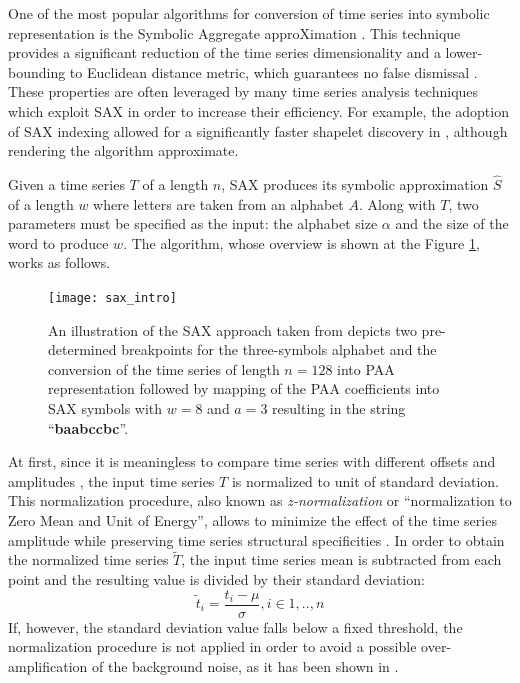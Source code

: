 One of the most popular algorithms for conversion of time series into symbolic representation is the Symbolic Aggregate approXimation \cite{sax}. 
This technique provides a significant reduction of the time series dimensionality and a lower-bounding to Euclidean distance 
metric, which guarantees no false dismissal \cite{citeulike:2821475}. 
These properties are often leveraged by many time series analysis techniques which exploit SAX in order to increase their efficiency. 
For example, the adoption of SAX indexing allowed for a significantly faster shapelet discovery in \cite{citeulike:12563493}, 
although rendering the algorithm approximate. 

Given a time series $T$ of a length $n$, SAX produces its symbolic approximation $\hat{S}$ of a length $w$ where letters are taken 
from an alphabet $A$. Along with $T$, two parameters must be specified as the input: the alphabet size $\alpha$ and the size of 
the word to produce $w$. The algorithm, whose overview is shown at the Figure \ref{fig:sax_intro}, works as follows. 

\begin{figure}[tbp]
   \centering
   \texttt{[image: sax\_intro]}
   \caption[An illustration of the symbolic aggregate discretization algorithm.]
   {An illustration of the SAX approach taken from \cite{citeulike:2821475} depicts two pre-determined breakpoints for the 
   three-symbols alphabet and the conversion of the time series of length $n=128$ into PAA representation followed by mapping of 
   the PAA coefficients into SAX symbols with $w=8$ and $a=3$ resulting in the string ``\textbf{baabccbc}''.}
   \label{fig:sax_intro}
\end{figure}

At first, since it is meaningless to compare time series with different offsets and amplitudes \cite{citeulike:532340}, the input time 
series $T$ is normalized to unit of standard deviation. This normalization procedure, also known as \textit{z-normalization} or 
``normalization to Zero Mean and Unit of Energy'', allows to minimize the effect of the time series amplitude while preserving time 
series structural specificities \cite{citeulike:3815880}. In order to obtain the normalized time series $\widetilde{T}$, the 
input time series mean is subtracted from each point and the resulting value is divided by their standard deviation:
\begin{equation}
\widetilde{t}_{i} = \frac{t_{i}-\mu}{\sigma}, i \in {1,..,n}
\label{eq:znorm}
\end{equation}
If, however, the standard deviation value falls below a fixed threshold, the normalization procedure is not applied in order to avoid 
a possible over-amplification of the background noise, as it has been shown in \cite{citeulike:2821475}.

